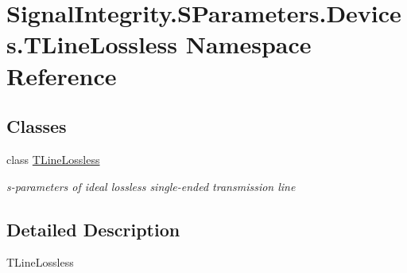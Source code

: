 \hypertarget{namespaceSignalIntegrity_1_1SParameters_1_1Devices_1_1TLineLossless}{}\section{Signal\+Integrity.\+S\+Parameters.\+Devices.\+T\+Line\+Lossless Namespace Reference}
\label{namespaceSignalIntegrity_1_1SParameters_1_1Devices_1_1TLineLossless}
\subsection*{Classes}
\begin{DoxyCompactItemize}
\item 
class \hyperlink{classSignalIntegrity_1_1SParameters_1_1Devices_1_1TLineLossless_1_1TLineLossless}{T\+Line\+Lossless}
\begin{DoxyCompactList}\small\item\em s-\/parameters of ideal lossless single-\/ended transmission line \end{DoxyCompactList}\end{DoxyCompactItemize}


\subsection{Detailed Description}
\begin{DoxyVerb}TLineLossless\end{DoxyVerb}
 